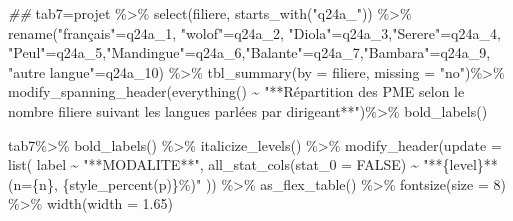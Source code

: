 \documentclass[
  letterpaper,
  DIV=11,
  numbers=noendperiod]{scrartcl}
\newenvironment{Shaded}{\begin{snugshade}}{\end{snugshade}}
\newcommand{\AttributeTok}[1]{\textcolor[rgb]{0.40,0.45,0.13}{#1}}
\newcommand{\ConstantTok}[1]{\textcolor[rgb]{0.56,0.35,0.01}{#1}}
\newcommand{\DecValTok}[1]{\textcolor[rgb]{0.68,0.00,0.00}{#1}}
\newcommand{\DocumentationTok}[1]{\textcolor[rgb]{0.37,0.37,0.37}{\textit{#1}}}
\newcommand{\FloatTok}[1]{\textcolor[rgb]{0.68,0.00,0.00}{#1}}
\newcommand{\FunctionTok}[1]{\textcolor[rgb]{0.28,0.35,0.67}{#1}}
\newcommand{\NormalTok}[1]{\textcolor[rgb]{0.00,0.23,0.31}{#1}}
\newcommand{\OtherTok}[1]{\textcolor[rgb]{0.00,0.23,0.31}{#1}}
\newcommand{\SpecialCharTok}[1]{\textcolor[rgb]{0.37,0.37,0.37}{#1}}
\newcommand{\StringTok}[1]{\textcolor[rgb]{0.13,0.47,0.30}{#1}}
\begin{document}
\begin{Shaded}
\begin{Highlighting}[]
\DocumentationTok{\#\#}
\NormalTok{tab7}\OtherTok{=}\NormalTok{projet }\SpecialCharTok{\%\textgreater{}\%}
  \FunctionTok{select}\NormalTok{(filiere, }\FunctionTok{starts\_with}\NormalTok{(}\StringTok{"q24a\_"}\NormalTok{)) }\SpecialCharTok{\%\textgreater{}\%}
     \FunctionTok{rename}\NormalTok{(}\StringTok{"français"}\OtherTok{=}\NormalTok{q24a\_1, }\StringTok{"wolof"}\OtherTok{=}\NormalTok{q24a\_2, }\StringTok{"Diola"}\OtherTok{=}\NormalTok{q24a\_3,}\StringTok{"Serere"}\OtherTok{=}\NormalTok{q24a\_4,}
            \StringTok{"Peul"}\OtherTok{=}\NormalTok{q24a\_5,}\StringTok{"Mandingue"}\OtherTok{=}\NormalTok{q24a\_6,}\StringTok{"Balante"}\OtherTok{=}\NormalTok{q24a\_7,}\StringTok{"Bambara"}\OtherTok{=}\NormalTok{q24a\_9,}
            \StringTok{"autre langue"}\OtherTok{=}\NormalTok{q24a\_10) }\SpecialCharTok{\%\textgreater{}\%} 
    \FunctionTok{tbl\_summary}\NormalTok{(}\AttributeTok{by =}\NormalTok{ filiere, }\AttributeTok{missing =} \StringTok{"no"}\NormalTok{)}\SpecialCharTok{\%\textgreater{}\%}
      \FunctionTok{modify\_spanning\_header}\NormalTok{(}\FunctionTok{everything}\NormalTok{() }\SpecialCharTok{\textasciitilde{}} \StringTok{"**Répartition des PME selon le nombre  filiere suivant les langues parlées par dirigeant**"}\NormalTok{)}\SpecialCharTok{\%\textgreater{}\%} 
          \FunctionTok{bold\_labels}\NormalTok{()}

\NormalTok{tab7}\SpecialCharTok{\%\textgreater{}\%} \FunctionTok{bold\_labels}\NormalTok{() }\SpecialCharTok{\%\textgreater{}\%} 
  \FunctionTok{italicize\_levels}\NormalTok{()  }\SpecialCharTok{\%\textgreater{}\%} 
  \FunctionTok{modify\_header}\NormalTok{(}\AttributeTok{update =} \FunctionTok{list}\NormalTok{( label }\SpecialCharTok{\textasciitilde{}} \StringTok{"**MODALITE**"}\NormalTok{, }\FunctionTok{all\_stat\_cols}\NormalTok{(}\AttributeTok{stat\_0 =} \ConstantTok{FALSE}\NormalTok{) }\SpecialCharTok{\textasciitilde{}} \StringTok{"**\{level\}** (n=\{n\}, \{style\_percent(p)\}\%)"}
\NormalTok{  )) }\SpecialCharTok{\%\textgreater{}\%}  \FunctionTok{as\_flex\_table}\NormalTok{() }\SpecialCharTok{\%\textgreater{}\%}
  \FunctionTok{fontsize}\NormalTok{(}\AttributeTok{size =} \DecValTok{8}\NormalTok{) }\SpecialCharTok{\%\textgreater{}\%}
  \FunctionTok{width}\NormalTok{(}\AttributeTok{width =} \FloatTok{1.65}\NormalTok{)}
\end{Highlighting}
\end{Shaded}
\end{document}
